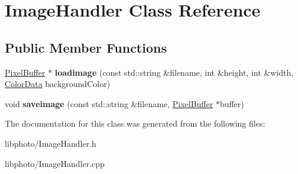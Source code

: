 \hypertarget{classImageHandler}{\section{Image\-Handler Class Reference}
\label{classImageHandler}
}
\subsection*{Public Member Functions}
\begin{DoxyCompactItemize}
\item 
\hypertarget{classImageHandler_a0042244c7f1462f4ffc2403f139bf286}{\hyperlink{classPixelBuffer}{Pixel\-Buffer} $\ast$ {\bfseries loadimage} (const std\-::string \&filename, int \&height, int \&width, \hyperlink{classColorData}{Color\-Data} background\-Color)}\label{classImageHandler_a0042244c7f1462f4ffc2403f139bf286}

\item 
\hypertarget{classImageHandler_ace874907681fc4970f6a2ae2377833b9}{void {\bfseries saveimage} (const std\-::string \&filename, \hyperlink{classPixelBuffer}{Pixel\-Buffer} $\ast$buffer)}\label{classImageHandler_ace874907681fc4970f6a2ae2377833b9}

\end{DoxyCompactItemize}


The documentation for this class was generated from the following files\-:\begin{DoxyCompactItemize}
\item 
libphoto/Image\-Handler.\-h\item 
libphoto/Image\-Handler.\-cpp\end{DoxyCompactItemize}
